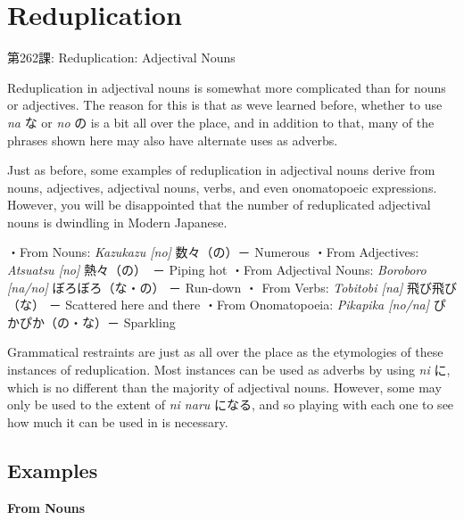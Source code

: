     
\chapter{Reduplication}

\begin{center}
\begin{Large}
第262課: Reduplication: Adjectival Nouns 
\end{Large}
\end{center}
 
\par{ Reduplication in adjectival nouns is somewhat more complicated than for nouns or adjectives. The reason for this is that as we\textquotesingle ve learned before, whether to use \emph{na }な or \emph{no }の is a bit all over the place, and in addition to that, many of the phrases shown here may also have alternate uses as adverbs. }

\par{ Just as before, some examples of reduplication in adjectival nouns derive from nouns, adjectives, adjectival nouns, verbs, and even onomatopoeic expressions. However, you will be disappointed that the number of reduplicated adjectival nouns is dwindling in Modern Japanese. }

\par{・From Nouns: \emph{Kazukazu [no] }数々（の）－ Numerous \hfill\break
・From Adjectives: \emph{Atsuatsu [no] }熱々（の）　－ Piping hot \hfill\break
・From Adjectival Nouns: \emph{Boroboro [na\slash no] }ぼろぼろ（な・の） － Run-down \hfill\break
・ From Verbs: \emph{Tobitobi [na] }飛び飛び（な） － Scattered here and there \hfill\break
・From Onomatopoeia: \emph{Pikapika [no\slash na] }ぴかぴか（の・な）－ Sparkling }

\par{ Grammatical restraints are just as all over the place as the etymologies of these instances of reduplication. Most instances can be used as adverbs by using \emph{ni }に, which is no different than the majority of adjectival nouns. However, some may only be used to the extent of \emph{ni naru }になる, and so playing with each one to see how much it can be used in is necessary. }
      
\section{Examples}
 
\begin{center}
\textbf{From Nouns }
\end{center}

